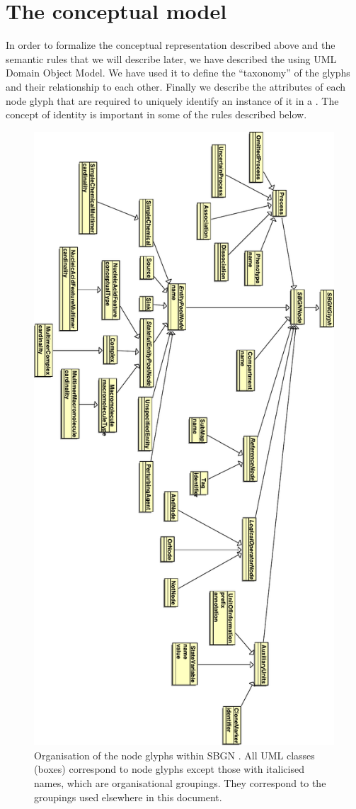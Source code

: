 \section{The conceptual model}
\label{sec:conceptual-model}

In order to formalize the conceptual representation described above and the semantic rules that we will describe later, we have described the \PDl using UML Domain Object Model. We have used it to define the ``taxonomy'' of the \PD glyphs and their relationship to each other. Finally we describe the attributes of each node glyph that are required to uniquely identify an instance of it in a \PDm. The concept of identity is important in some of the rules described below.

\begin{figure}[htb]
\begin{center}
\includegraphics[width=0.6\linewidth]{images/sbgn_node_taxonomy}
\caption{Organisation of the node glyphs within SBGN \PDl. All UML classes (boxes) correspond to \PD node glyphs except those with italicised names, which are organisational groupings. They correspond to the groupings used elsewhere in this document.}
\label{fig:sbgn_node_tax}
\end{center}
\end{figure}

